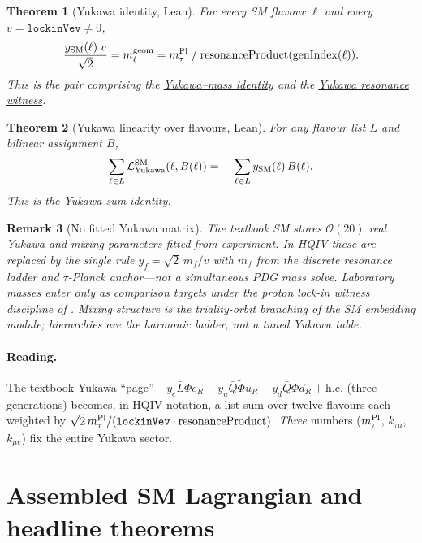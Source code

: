 \documentclass[11pt]{amsart}
\newtheorem{theorem}{Theorem}[section]
\newtheorem{remark}[theorem]{Remark}
\begin{document}
\begin{theorem}[Yukawa identity, Lean]
\label{thm:yukawa-identity}
For every SM flavour $\ell$ and every $v=\texttt{lockinVev}\neq 0$,
\[
\frac{y_{\rm SM}(\ell)\;v}{\sqrt{2}} = m_\ell^{\mathrm{geom}}
= m_\tau^{\rm Pl}\;/\;\mathrm{resonanceProduct}(\mathrm{genIndex}(\ell)).
\]
This is the pair comprising the
\hyperref[lean:yukawa-mass]{Yukawa--mass identity} and the
\hyperref[lean:yukawa-resonance]{Yukawa resonance witness}.
\end{theorem}

\begin{theorem}[Yukawa linearity over flavours, Lean]
\label{thm:yukawa-sum}
For any flavour list $L$ and bilinear assignment $B$,
\[
\sum_{\ell\in L} \mathcal{L}^{\rm SM}_{\rm Yukawa}(\ell, B(\ell))
= -\,\sum_{\ell\in L} y_{\rm SM}(\ell)\,B(\ell) .
\]
This is the \hyperref[lean:yukawa-sum]{Yukawa sum identity}.
\end{theorem}

\begin{remark}[No fitted Yukawa matrix]
\label{rem:no-fits}
The textbook SM stores $\mathcal{O}(20)$ real Yukawa and mixing parameters
fitted from experiment. In HQIV these are replaced by the single rule
$y_f=\sqrt{2}\,m_f/v$ with $m_f$ from the discrete resonance ladder and
$\tau$-Planck anchor---not a simultaneous PDG mass solve. Laboratory masses
enter only as comparison targets under the proton lock-in witness discipline
of \cite{hqiv-mass-spectrum-paper,hqiv-kirchhoff-paper}. Mixing structure is
the triality-orbit branching of the SM embedding module; hierarchies are the
harmonic ladder, not a tuned Yukawa table.
\end{remark}

\paragraph{Reading.}
The textbook Yukawa ``page'' $-y_e\bar L\Phi e_R - y_u\bar Q\tilde\Phi u_R
- y_d\bar Q\Phi d_R + \text{h.c.}$ (three generations) becomes, in HQIV
notation, a list-sum over twelve flavours each weighted by
$\sqrt{2}\,m_\tau^{\rm Pl}/(\texttt{lockinVev}\cdot\mathrm{resonanceProduct})$.
\emph{Three} numbers ($m_\tau^{\rm Pl}$, $k_{\tau\mu}$, $k_{\mu e}$) fix the
entire Yukawa sector.

\section{Assembled SM Lagrangian and headline theorems}
\label{sec:assembly}
\end{document}
